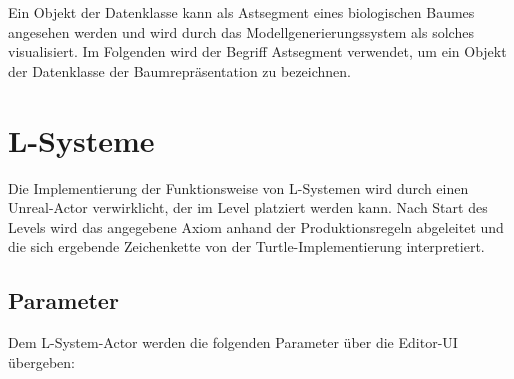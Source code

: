 Ein Objekt der Datenklasse kann als Astsegment eines biologischen Baumes angesehen werden und wird durch das Modellgenerierungssystem als solches visualisiert. Im Folgenden wird der Begriff \glqq Astsegment\grqq{} verwendet, um ein Objekt der Datenklasse der Baumrepräsentation zu bezeichnen.

\section{L-Systeme} \label{sec:ImplementierungLS}

Die Implementierung der Funktionsweise von L-Systemen wird durch einen Unreal-Actor verwirklicht, der im Level platziert werden kann. Nach Start des Levels wird das angegebene Axiom anhand der Produktionsregeln abgeleitet und die sich ergebende Zeichenkette von der Turtle-Implementierung interpretiert.

\subsection{Parameter}

Dem L-System-Actor werden die folgenden Parameter über die Editor-UI übergeben:

